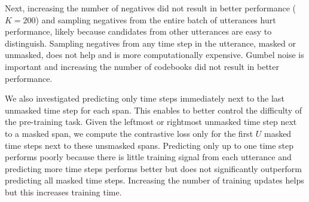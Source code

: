 \documentclass{article}
\begin{document}
Next, increasing the number of negatives did not result in better performance ($K=200$) and sampling negatives from the entire batch of utterances hurt performance, likely because candidates from other utterances are easy to distinguish.
Sampling negatives from any time step in the utterance, masked or unmasked, does not help and is more computationally expensive.
Gumbel noise is important and increasing the number of codebooks did not result in better performance.

We also investigated predicting only time steps immediately next to the last unmasked time step for each span. 
This enables to better control the difficulty of the pre-training task.
Given the leftmost or rightmost unmasked time step next to a masked span, we compute the contrastive loss only for the first $U$ masked time steps next to these unsmasked spans.
Predicting only up to one time step performs poorly because there is little training signal from each utterance and predicting more time steps performs better but does not significantly outperform predicting all masked time steps.
Increasing the number of training updates helps but this increases training time.
\end{document}
